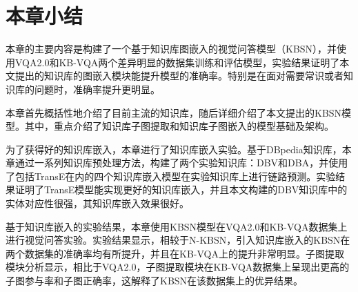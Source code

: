 \section{本章小结}
本章的主要内容是构建了一个基于知识库图嵌入的视觉问答模型（KBSN），并使用VQA2.0和KB-VQA两个差异明显的数据集训练和评估模型，实验结果证明了本文提出的知识库的图嵌入模块能提升模型的准确率。特别是在面对需要常识或者知识库的问题时，准确率提升更明显。

本章首先概括性地介绍了目前主流的知识库，随后详细介绍了本文提出的KBSN模型。其中，重点介绍了知识库子图提取和知识库子图嵌入的模型基础及架构。

为了获得好的知识库嵌入，本章进行了知识库嵌入实验。基于DBpedia知识库，本章通过一系列知识库预处理方法，构建了两个实验知识库：DBV和DBA，并使用了包括TransE在内的四个知识库嵌入模型在实验知识库上进行链路预测。实验结果证明了TransE模型能实现更好的知识库嵌入，并且本文构建的DBV知识库中的实体对应性很强，其知识库嵌入效果很好。

基于知识库嵌入的实验结果，本章使用KBSN模型在VQA2.0和KB-VQA数据集上进行视觉问答实验。实验结果显示，相较于N-KBSN，引入知识库嵌入的KBSN在两个数据集的准确率均有所提升，并且在KB-VQA上的提升非常明显。子图提取模块分析显示，相比于VQA2.0，子图提取模块在KB-VQA数据集上呈现出更高的子图参与率和子图正确率，这解释了KBSN在该数据集上的优异结果。






















